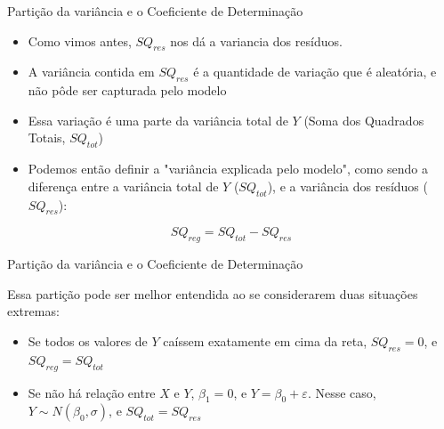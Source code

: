 \documentclass{beamer}\usepackage[]{graphicx}\usepackage[]{color}
\begin{document}
\begin{frame}{Partição da variância e o Coeficiente de Determinação}

\begin{itemize}
\item Como vimos antes, $SQ_{res}$ nos dá a variancia dos resíduos. \pause
\vfill
\item A variância contida em $SQ_{res}$ é a quantidade de variação que é aleatória, e não pôde ser capturada pelo modelo \pause
\vfill
\item Essa variação é uma parte da variância total de $Y$ (Soma dos Quadrados Totais, $SQ_{tot}$) \pause
\vfill 
\item Podemos então definir a "variância explicada pelo modelo", como sendo a diferença entre a variância total de $Y$ ($SQ_{tot}$), e a variância dos resíduos ($SQ_{res}$):
\end{itemize}
\vfill
\begin{equation*}
  SQ_{reg} =  SQ_{tot} - SQ_{res}
\end{equation*}

\end{frame}


\begin{frame}{Partição da variância e o Coeficiente de Determinação}

Essa partição pode ser melhor entendida ao se considerarem duas situações extremas: \pause
\vfill

\begin{itemize}
  \item Se todos os valores de $Y$ caíssem exatamente em cima da reta, $SQ_{res} = 0$, e $SQ_{reg} = SQ_{tot}$ \pause
  \vfill
  \item Se não há relação entre $X$ e $Y$, $\beta _1 = 0$, e $Y = \beta_0 + \varepsilon$. Nesse caso, $Y \sim N(\beta _0,\sigma)$, e $SQ_{tot} = SQ_{res}$  \pause
\end{itemize}

\end{frame}
\end{document}
